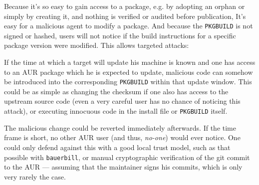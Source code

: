 Because it's so easy to gain access to a package, e.g. by adopting an orphan or simply by creating it, and nothing is verified or audited before publication, It's easy for a malicious agent to modify a package.
And because the \texttt{PKGBUILD} is not signed or hashed, users will not notice if the build instructions for a specific package version were modified. This allows targeted attacks:

If the time at which a target will update his machine is known and one has access to an AUR package which he is expected to update, malicious code can somehow be introduced into the corresponding \texttt{PKGBUILD} within that update window.
This could be as simple as changing the checksum if one also has access to the upstream source code (even a very careful user has no chance of noticing this attack), or executing innocuous code in the install file or \texttt{PKGBUILD} itself.

The malicious change could be reverted immediately afterwards. If the time frame is short, no other AUR user (and thus, \emph{no-one}) would ever notice.
One could only defend against this with a good local trust model, such as that possible with \texttt{bauerbill}, or manual cryptographic verification of the git commit to the AUR --- assuming that the maintainer signs his commits, which is only very rarely the case.
